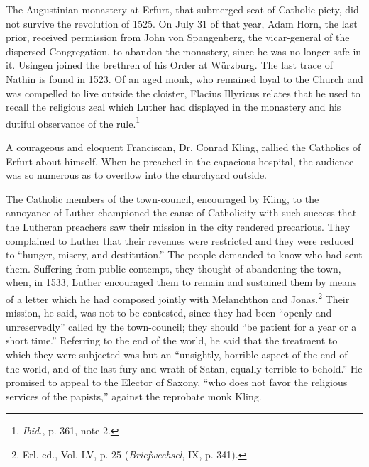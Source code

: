 The Augustinian monastery at Erfurt, that submerged seat of
Catholic piety, did not survive the revolution of 1525. On July
31 of that year, Adam Horn, the last prior, received permission
from John von Spangenberg, the vicar-general of the dispersed
Congregation, to abandon the monastery, since he was no longer
safe in it. Usingen joined the brethren of his Order at Würzburg.
The last trace of Nathin is found in 1523. Of an aged monk, who
remained loyal to the Church and was compelled to live outside
the cloister, Flacius Illyricus relates that he used to recall the religious
zeal which Luther had displayed in the monastery and his dutiful observance
of the rule.\footnote{\textit{Ibid.}, p. 361, note 2.}

A courageous and eloquent Franciscan, Dr. Conrad Kling, rallied
the Catholics of Erfurt about himself. When he preached in the
capacious hospital, the audience was so numerous as to overflow
into the churchyard outside.

The Catholic members of the town-council, encouraged by Kling,
to the annoyance of Luther championed the cause of Catholicity
with such success that the Lutheran preachers saw their mission in
the city rendered precarious. They complained to Luther that their
revenues were restricted and they were reduced to “hunger, misery,
and destitution.” The people demanded to know who had sent
them. Suffering from public contempt, they thought of abandoning the town,
when, in 1533, Luther encouraged them to remain and
sustained them by means of a letter which he had composed jointly
with Melanchthon and Jonas.\footnote{Erl. ed., Vol. LV, p. 25 (\textit{Briefwechsel}, IX, p. 341).}
Their mission, he said, was not to
be contested, since they had been “openly and unreservedly” called
by the town-council; they should “be patient for a year or a short
time.” Referring to the end of the world, he said that the treatment
to which they were subjected was but an “unsightly, horrible
aspect of the end of the world, and of the last fury and wrath of
Satan, equally terrible to behold.” He promised to appeal to the
Elector of Saxony, “who does not favor the religious services of the
papists,” against the reprobate monk Kling.

